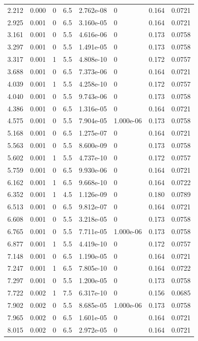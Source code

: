 \documentclass[preview]{standalone}
\begin{document}
{{\begin{tabular}{L{1.2cm}C{1.2cm} C{0.3cm}C{0.5cm} C{1.4cm}C{1.4cm} C{1.4cm}C{1.4cm}}
  2.212  &  0.000  & 0     & 6.5 &  2.762e-08  & 0  & 0.164 &  0.0721   \\ 
  2.925  &  0.001  & 0     & 6.5 &  3.160e-05  & 0  & 0.164 &  0.0721   \\ 
  3.161  &  0.001  & 0     & 5.5 &  4.616e-06  & 0  & 0.173 &  0.0758   \\ 
  3.297  &  0.001  & 0     & 5.5 &  1.491e-05  & 0  & 0.173 &  0.0758   \\ 
  3.317  &  0.001  & 1     & 5.5 &  4.808e-10  & 0  & 0.172 &  0.0757   \\ 
  3.688  &  0.001  & 0     & 6.5 &  7.373e-06  & 0  & 0.164 &  0.0721   \\ 
  4.039  &  0.001  & 1     & 5.5 &  4.258e-10  & 0  & 0.172 &  0.0757   \\ 
  4.040  &  0.001  & 0     & 5.5 &  9.743e-06  & 0  & 0.173 &  0.0758   \\ 
  4.386  &  0.001  & 0     & 6.5 &  1.316e-05  & 0  & 0.164 &  0.0721   \\ 
  4.575  &  0.001  & 0     & 5.5 &  7.904e-05  & 1.000e-06  & 0.173 &  0.0758   \\ 
  5.168  &  0.001  & 0     & 6.5 &  1.275e-07  & 0  & 0.164 &  0.0721   \\ 
  5.563  &  0.001  & 0     & 5.5 &  8.600e-09  & 0  & 0.173 &  0.0758   \\ 
  5.602  &  0.001  & 1     & 5.5 &  4.737e-10  & 0  & 0.172 &  0.0757   \\ 
  5.759  &  0.001  & 0     & 6.5 &  9.930e-06  & 0  & 0.164 &  0.0721   \\ 
  6.162  &  0.001  & 1     & 6.5 &  9.668e-10  & 0  & 0.164 &  0.0722   \\ 
  6.352  &  0.001  & 1     & 4.5 &  1.126e-09  & 0  & 0.180 &  0.0789   \\ 
  6.513  &  0.001  & 0     & 6.5 &  9.812e-07  & 0  & 0.164 &  0.0721   \\ 
  6.608  &  0.001  & 0     & 5.5 &  3.218e-05  & 0  & 0.173 &  0.0758   \\ 
  6.765  &  0.001  & 0     & 5.5 &  7.711e-05  & 1.000e-06  & 0.173 &  0.0758   \\ 
  6.877  &  0.001  & 1     & 5.5 &  4.419e-10  & 0  & 0.172 &  0.0757   \\ 
  7.148  &  0.001  & 0     & 6.5 &  1.190e-05  & 0  & 0.164 &  0.0721   \\ 
  7.247  &  0.001  & 1     & 6.5 &  7.805e-10  & 0  & 0.164 &  0.0722   \\ 
  7.297  &  0.001  & 0     & 5.5 &  1.200e-05  & 0  & 0.173 &  0.0758   \\ 
  7.722  &  0.002  & 1     & 7.5 &  6.317e-10  & 0  & 0.156 &  0.0685   \\ 
  7.902  &  0.002  & 0     & 5.5 &  8.685e-05  & 1.000e-06  & 0.173 &  0.0758   \\ 
  7.965  &  0.002  & 0     & 6.5 &  1.601e-05  & 0  & 0.164 &  0.0721   \\ 
  8.015  &  0.002  & 0     & 6.5 &  2.972e-05  & 0  & 0.164 &  0.0721   \\ 
\hline 
\end{tabular} 

}}
\end{document}
